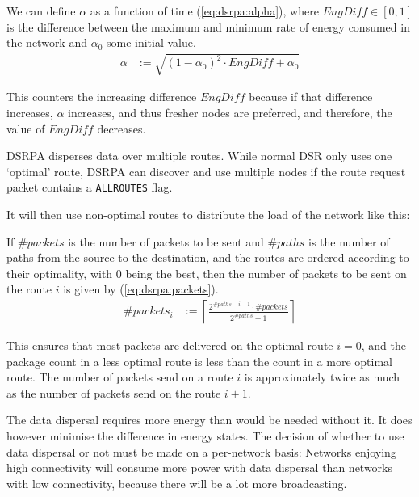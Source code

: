 We can define $\alpha$ as a function of time (\ref{eq:dsrpa:alpha}),
where $EngDiff \in [0,1]$ is the difference between the maximum and minimum rate
of energy consumed in the network and $\alpha_{0}$ some initial value.
\begin{align}
    \alpha &:= \sqrt{(1-\alpha_{0})^{2} \cdot EngDiff + \alpha_{0}}
    \label{eq:dsrpa:alpha}
\end{align}

This counters the increasing difference $EngDiff$ because if that
difference increases, $\alpha$ increases, and thus fresher nodes are preferred,
and therefore, the value of $EngDiff$ decreases.

DSRPA disperses data over multiple routes.  While normal DSR only uses one
`optimal' route, DSRPA can discover and use multiple nodes if the route request
packet contains a \texttt{ALLROUTES} flag.

It will then use non-optimal routes to distribute the load of the network like
this:

If $\#packets$ is the number of packets to be sent and
$\#paths$ is the number of paths from the source to the
destination, and the routes are ordered according to their optimality,
with 0 being the best, then the number of packets to be sent on the route $i$
is given by (\ref{eq:dsrpa:packets}).
\begin{align}
     \#packets_{i} &:= \left\lceil \frac{2^{\# paths - i - 1} \cdot \# packets}{2^{\#paths} - 1} \right\rceil
     \label{eq:dsrpa:packets}
\end{align}

This ensures that most packets are delivered on the optimal route $i=0$, and
the package count in a less optimal route is less than the count in a more
optimal route. The number of packets send on a route $i$ is approximately
twice as much as the number of packets send on the route $i+1$.

The data dispersal requires more energy than would be needed without it. It
does however minimise the difference in energy states. The decision of whether
to use data dispersal or not must be made on a per-network basis: Networks
enjoying high connectivity will consume more power with data dispersal than
networks with low connectivity, because there will be a lot more broadcasting.
